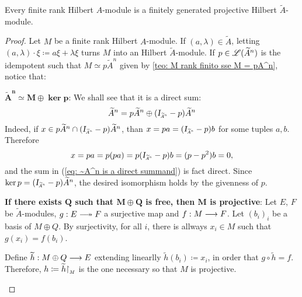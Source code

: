 \begin{proposicao}\label{prop: M eh finitamente gerado projetivo}
Every finite rank Hilbert $A$-module is a finitely generated projective Hilbert $\widetilde A$-module.
\begin{proof}
Let $M$ be a finite rank Hilbert $A$-module. If $(a,\lambda) \in \widetilde A$, letting $(a,\lambda)\cdot \xi \coloneqq a\xi + \lambda\xi$ turns $M$ into an Hilbert $\widetilde A$-module. If $p\in \mathscr L({\widetilde{A}}^n)$ is the idempotent such that $M \simeq p{\widetilde{A}}^n$ given by \ref{teo: M rank finito sse M = pA^n}, notice that:
\begin{itroman}
    \item \ensuremath{\boldsymbol{{\widetilde{A}}^n \simeq M \oplus \ker p}}:  We shall see that it is a direct sum:
    \begin{equation}
    \label{eq: ~A^n is a direct summand}
        {{\widetilde{A}}}^n = p{{\widetilde{A}}}^n \oplus (\sub\Id{{\widetilde{A}}^n}-p){{\widetilde{A}}}^n
    \end{equation}
    Indeed, if $x \in p{\widetilde{A}}^n \cap (\sub\Id{{\widetilde{A}}^n}-p){{\widetilde{A}}}^n$, than $x = pa = (\sub\Id{{\widetilde{A}}^n}-p)b$ for some tuples $a, b$. Therefore
    \[
    x = pa = p(pa) = p(\sub\Id{{{\widetilde{A}}}^n}-p)b = (p - p^2)b = 0,
    \]
    and the sum in (\ref{eq: ~A^n is a direct summand}) is fact direct. Since $\ker p = (\sub\Id{{\widetilde{A}}^n}-p){\widetilde{A}}^n$, the desired isomorphism holds by the givenness of $p$.
    \item \label{item: M projetivo sse M oplus Q livre}\textbf{If there exists $\boldsymbol Q$ such that $\boldsymbol{M\oplus Q}$ is free, then $\boldsymbol M$ is projective}: Let $E$, $F$ be $\widetilde A$-modules, $g:E \longtwoheadrightarrow F$ a surjective map and $f:M \longrightarrow F$. Let $(b_i)_i$ be a basis of $M\oplus Q$. By surjectivity, for all $i$, there is allways $x_i\in M$  such that $g(x_i) = f(b_i)$. 
    
    Define $\widetilde{h}:M\oplus Q \longrightarrow E$ extending linearlly $\widetilde{h}(b_i) \coloneqq x_i$, in order that $g \circ \widetilde{h} = f$. Therefore, $h \coloneqq \widetilde{h} \sub{\restrita}{M}$ is the one necessary so that $M$ is projective.
    

\end{itroman}
\end{proof}
\end{proposicao}
